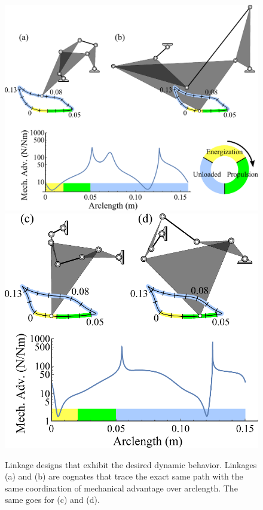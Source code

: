 \documentclass[journal]{IEEEtran}
\begin{document}
\begin{figure}[!t]
\centering
\includegraphics[scale=0.4]{synth_results_first}
\hfil
\vspace{5mm}
\includegraphics[scale=0.4]{synth_results_second}
\caption{Linkage designs that exhibit the desired dynamic behavior.  Linkages (a) and (b) are cognates that trace the exact same path with the same coordination of mechanical advantage over arclength.  The same goes for (c) and (d).}
\label{synth_results}
\end{figure}
\end{document}
